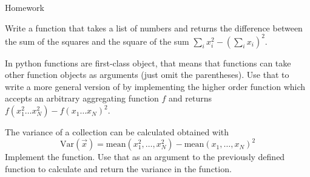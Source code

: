 \documentclass[a4paper, draft=False]{scrartcl}
\begin{document}
\begin{exam}[Homework]{Homework}
\begin{problem*}[\auto]
        \begin{parts}
        \item{} Write a function  that takes a list
          of numbers and returns the difference between the sum of the squares and
          the square of the sum $\sum_i x_i^2 - \left(\sum_i x_i\right)^2$.
        \item{} In python functions are first-class object, that means
          that functions can take other function objects as arguments (just omit
          the parentheses). Use that to write a more general version of
           by implementing the higher order function
           which accepts an arbitrary aggregating
          function $f$ and returns $f(x_1^2\ldots x_N^2) - f(x_1\ldots x_N)^2$.
        \item{} The variance of a collection can be calculated obtained with
          \begin{equation*}
            \mathrm{Var}(\vec{x}) = \mathrm{mean}(x_1^2, \ldots, x_N^2) -
            \mathrm{mean}(x_1, \ldots,  x_N)^2
          \end{equation*}
          Implement the  function. Use that as an argument to the previously defined
           function to calculate and return the variance
          in the  function.
        \end{parts}
      \end{problem*}


    \end{exam}

  
\end{document}
